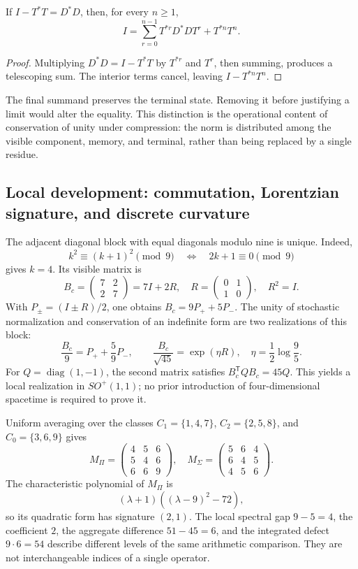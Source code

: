 \begin{proposition}
If \(I-T^*T=D^*D\), then, for every \(n\ge1\),
\begin{equation}
 I=\sum_{r=0}^{n-1}T^{*r}D^*DT^r+T^{*n}T^n.
 \label{eq:telescopia}
\end{equation}
\end{proposition}
\begin{proof}
Multiplying \(D^*D=I-T^*T\) by \(T^{*r}\) and \(T^r\), then summing, produces a telescoping sum. The interior terms cancel, leaving \(I-T^{*n}T^n\).
\end{proof}

The final summand preserves the terminal state. Removing it before justifying a limit would alter the equality. This distinction is the operational content of conservation of unity under compression: the norm is distributed among the visible component, memory, and terminal, rather than being replaced by a single residue.

\subsection{Local development: commutation, Lorentzian signature, and discrete curvature}

The adjacent diagonal block with equal diagonals modulo nine is unique. Indeed,
\[
 k^2\equiv(k+1)^2\pmod9\quad\Longleftrightarrow\quad2k+1\equiv0\pmod9
\]
gives \(k=4\). Its visible matrix is
\[
 B_c=\begin{pmatrix}7&2\\2&7\end{pmatrix}=7I+2R,
 \quad R=\begin{pmatrix}0&1\\1&0\end{pmatrix},\quad R^2=I.
\]
With \(P_\pm=(I\pm R)/2\), one obtains \(B_c=9P_++5P_-\). The unity of stochastic normalization and conservation of an indefinite form are two realizations of this block:
\[
 \frac{B_c}{9}=P_++\frac59P_-,\qquad
 \frac{B_c}{\sqrt{45}}=\exp(\eta R),\quad\eta=\frac12\log\frac95.
\]
For \(Q=\operatorname{diag}(1,-1)\), the second matrix satisfies \(B_c^{\mathsf T}QB_c=45Q\). This yields a local realization in \(SO^+(1,1)\); no prior introduction of four-dimensional spacetime is required to prove it.

Uniform averaging over the classes \(C_1=\{1,4,7\}\), \(C_2=\{2,5,8\}\), and \(C_0=\{3,6,9\}\) gives
\[
 M_\Pi=\begin{pmatrix}4&5&6\\5&4&6\\6&6&9\end{pmatrix},\quad
 M_\Sigma=\begin{pmatrix}5&6&4\\6&4&5\\4&5&6\end{pmatrix}.
\]
The characteristic polynomial of \(M_\Pi\) is
\[
 (\lambda+1)((\lambda-9)^2-72),
\]
so its quadratic form has signature \((2,1)\). The local spectral gap \(9-5=4\), the coefficient \(2\), the aggregate difference \(51-45=6\), and the integrated defect \(9\cdot6=54\) describe different levels of the same arithmetic comparison. They are not interchangeable indices of a single operator.

